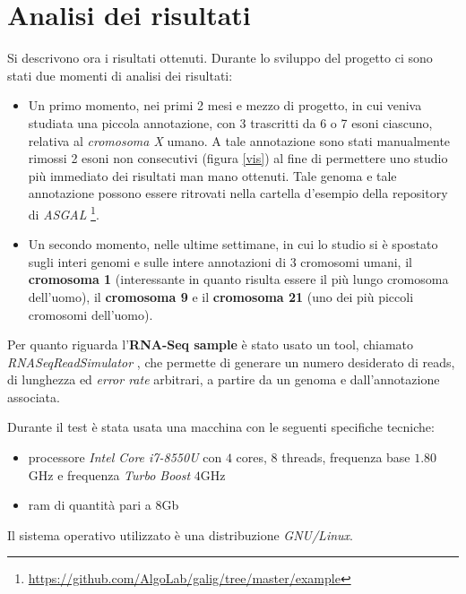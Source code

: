 \documentclass[a4paper,12pt, oneside]{book}
\begin{document}
\section{Analisi dei risultati}
Si descrivono ora i risultati ottenuti. Durante lo sviluppo del progetto ci sono
stati due momenti di analisi dei risultati:
\begin{itemize}
  \item Un primo momento, nei primi 2 mesi e mezzo di progetto, in cui veniva
  studiata una piccola annotazione, con 3 trascritti da 6 o 7 esoni ciascuno,
  relativa al \textit{cromosoma X} umano. A tale annotazione sono
  stati manualmente rimossi 2 esoni non consecutivi (figura \ref{vis}) al fine
  di permettere uno 
  studio più immediato dei risultati man mano ottenuti. Tale genoma e tale
  annotazione possono essere ritrovati nella cartella d'esempio della repository
  di \textit{ASGAL}
  \footnote{\url{https://github.com/AlgoLab/galig/tree/master/example}}.  
  \item Un secondo momento, nelle ultime settimane, in cui lo studio si è
  spostato sugli interi genomi e sulle intere annotazioni di 3 cromosomi umani,
  il \textbf{cromosoma 1} (interessante in quanto risulta essere il più lungo
  cromosoma dell'uomo), il \textbf{cromosoma 9} e il 
  \textbf{cromosoma 21} (uno dei più piccoli cromosomi dell'uomo).
\end{itemize}
Per quanto riguarda l'\textbf{RNA-Seq sample} è stato usato un tool, chiamato
\textit{RNASeqReadSimulator} \cite{seq} \cite{seq2}, che permette di generare un
numero desiderato di reads, di lunghezza ed \textit{error rate} arbitrari, a
partire da un genoma e dall'annotazione associata.
\begin{shaded}
  Durante il test è stata usata una macchina con le seguenti specifiche
  tecniche: 
  \begin{itemize}
    \item processore \textit{Intel Core i7-8550U} con $4$ cores, $8$ threads,
    frequenza base $1.80$GHz e frequenza \textit{Turbo Boost} $4$GHz
    \item ram di quantità pari a $8$Gb
  \end{itemize}
  Il sistema operativo utilizzato è una distribuzione \textit{GNU/Linux}.
\end{shaded}
\end{document}
